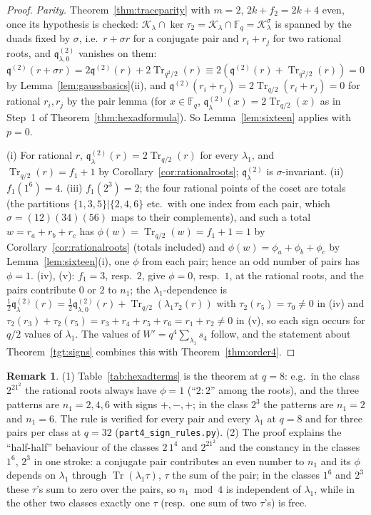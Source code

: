 \documentclass[12pt,a4paper]{amsart}
\theoremstyle{definition}
\newtheorem{remark}[theorem]{Remark}
\newcommand{\F}{\mathbb{F}}
\newcommand{\Tr}{\operatorname{Tr}}
\newcommand{\Kk}{\mathcal{K}}
\newcommand{\qq}{\mathfrak{q}}
\begin{document}
\begin{proof}
\emph{Parity.} Theorem~\ref{thm:traceparity} with $m=2$, $2k+f_2=2k+4$ even, once its hypothesis is checked: $\Kk_\lambda\cap\ker\tau_2=\Kk_\lambda\cap\F_q=\Kk_\lambda^\sigma$ is spanned by the duads fixed by $\sigma$, i.e.\ $r+\sigma r$ for a conjugate pair and $r_i+r_j$ for two rational roots, and $\qq^{(2)}_{\lambda,0}$ vanishes on them: $\qq^{(2)}(r+\sigma r)=2\qq^{(2)}(r)+2\Tr_{q^2/2}(r)\equiv2(\qq^{(2)}(r)+\Tr_{q^2/2}(r))=0$ by Lemma~\ref{lem:gaussbasics}(ii), and $\qq^{(2)}(r_i+r_j)=2\Tr_{q/2}(r_i+r_j)=0$ for rational $r_i,r_j$ by the pair lemma (for $x\in\F_q$, $\qq^{(2)}_\lambda(x)=2\Tr_{q/2}(x)$ as in Step~1 of Theorem~\ref{thm:hexadformula}). So Lemma~\ref{lem:sixteen} applies with $p=0$.

(i) For rational $r$, $\qq^{(2)}_\lambda(r)=2\Tr_{q/2}(r)$ for every $\lambda_1$, and $\Tr_{q/2}(r)=f_1+1$ by Corollary~\ref{cor:rationalroots}; $\qq^{(2)}_\lambda$ is $\sigma$-invariant. (ii) $f_1(1^6)=4$. (iii) $f_1(2^3)=2$; the four rational points of the coset are totals (the partitions $\{1,3,5\}|\{2,4,6\}$ etc.\ with one index from each pair, which $\sigma=(12)(34)(56)$ maps to their complements), and such a total $w=r_a+r_b+r_c$ has $\phi(w)=\Tr_{q/2}(w)=f_1+1=1$ by Corollary~\ref{cor:rationalroots} (totals included) and $\phi(w)=\phi_a+\phi_b+\phi_c$ by Lemma~\ref{lem:sixteen}(i), one $\phi$ from each pair; hence an odd number of pairs has $\phi=1$. (iv), (v): $f_1=3$, resp.\ $2$, give $\phi=0$, resp.\ $1$, at the rational roots, and the pairs contribute $0$ or $2$ to $n_1$; the $\lambda_1$-dependence is $\frac12\qq^{(2)}_{\lambda}(r)=\frac12\qq^{(2)}_{\lambda,0}(r)+\Tr_{q/2}(\lambda_1\tau_2(r))$ with $\tau_2(r_5)=\tau_0\ne0$ in (iv) and $\tau_2(r_3)+\tau_2(r_5)=r_3+r_4+r_5+r_6=r_1+r_2\ne0$ in (v), so each sign occurs for $q/2$ values of $\lambda_1$. The values of $W'=q^4\sum_{\lambda_1}s_4$ follow, and the statement about Theorem~\ref{tgt:signs} combines this with Theorem~\ref{thm:order4}.
\end{proof}

\begin{remark}
(1) Table~\ref{tab:hexadterms} is the theorem at $q=8$: e.g.\ in the class $2^21^2$ the rational roots always have $\phi=1$ (``$2{:}2$'' among the roots), and the three patterns are $n_1=2,4,6$ with signs $+,-,+$; in the class $2^3$ the patterns are $n_1=2$ and $n_1=6$. The rule is verified for every pair and every $\lambda_1$ at $q=8$ and for three pairs per class at $q=32$ (\texttt{part4\_sign\_rules.py}). (2) The proof explains the ``half-half'' behaviour of the classes $2\,1^4$ and $2^21^2$ and the constancy in the classes $1^6$, $2^3$ in one stroke: a conjugate pair contributes an even number to $n_1$ and its $\phi$ depends on $\lambda_1$ through $\Tr(\lambda_1\tau)$, $\tau$ the sum of the pair; in the classes $1^6$ and $2^3$ these $\tau$'s sum to zero over the pairs, so $n_1\bmod4$ is independent of $\lambda_1$, while in the other two classes exactly one $\tau$ (resp.\ one sum of two $\tau$'s) is free.
\end{remark}
\end{document}
